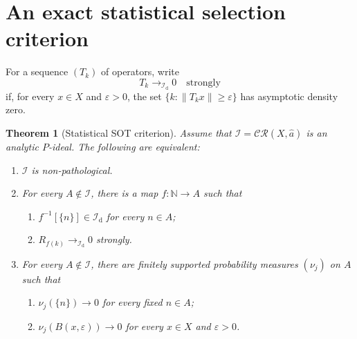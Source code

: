 \documentclass[11pt]{article}
\newtheorem{theorem}{Theorem}[section]
\theoremstyle{definition}
\theoremstyle{remark}
\newcommand{\N}{\mathbb N}
\newcommand{\I}{\mathcal I}
\newcommand{\CR}{\mathcal{CR}}
\newcommand{\Id}{\mathcal I_{\mathrm d}}
\newcommand{\eps}{\varepsilon}
\begin{document}
\section{An exact statistical selection criterion}

For a sequence $(T_k)$ of operators, write
\[
 T_k\longrightarrow_{\Id}0\quad\text{strongly}
\]
if, for every $x\in X$ and $\eps>0$, the set
$\{k:\|T_kx\|\geq\eps\}$ has asymptotic density zero.

\begin{theorem}[Statistical SOT criterion]\label{thm:statistical-criterion}
Assume that $\I=\CR(X,\widehat a)$ is an analytic $P$-ideal.  The following are
equivalent:
\begin{enumerate}[label=(\roman*)]
 \item $\I$ is non-pathological.
 \item For every $A\notin\I$, there is a map $f:\N\to A$ such that
       \begin{enumerate}[label=(\alph*)]
        \item $f^{-1}[\{n\}]\in\Id$ for every $n\in A$;
        \item $R_{f(k)}\to_{\Id}0$ strongly.
       \end{enumerate}
 \item For every $A\notin\I$, there are finitely supported probability
       measures $(\nu_j)$ on $A$ such that
       \begin{enumerate}[label=(\alph*)]
        \item $\nu_j(\{n\})\to0$ for every fixed $n\in A$;
        \item $\nu_j(B(x,\eps))\to0$ for every $x\in X$ and $\eps>0$.
       \end{enumerate}
\end{enumerate}
\end{theorem}
\end{document}
